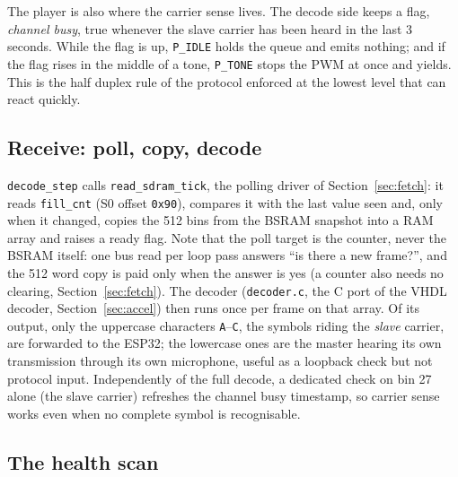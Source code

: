 \documentclass[a4paper,11pt]{article}
\begin{document}
The player is also where the carrier sense lives. The decode side keeps a flag,
\emph{channel busy}, true whenever the slave carrier has been heard in the last 3
seconds. While the flag is up, \texttt{P\_IDLE} holds the queue and emits nothing;
and if the flag rises in the middle of a tone, \texttt{P\_TONE} stops the PWM at
once and yields. This is the half duplex rule of the protocol enforced at the
lowest level that can react quickly.

\subsection{Receive: poll, copy, decode}

\texttt{decode\_step} calls \texttt{read\_sdram\_tick}, the polling driver of
Section~\ref{sec:fetch}: it reads \texttt{fill\_cnt} (S0 offset \texttt{0x90}),
compares it with the last value seen and, only when it changed, copies the 512
bins from the BSRAM snapshot into a RAM array and raises a ready flag. Note that
the poll target is the counter, never the BSRAM itself: one bus read per loop
pass answers ``is there a new frame?'', and the 512 word copy is paid only when
the answer is yes (a counter also needs no clearing, Section~\ref{sec:fetch}). The decoder (\texttt{decoder.c}, the C port of
the VHDL decoder, Section~\ref{sec:accel}) then runs once per frame on that
array. Of its output, only the uppercase characters \texttt{A}--\texttt{C}, the
symbols riding the \emph{slave} carrier, are forwarded to the ESP32; the
lowercase ones are the master hearing its own transmission through its own
microphone, useful as a loopback check but not protocol input. Independently of
the full decode, a dedicated check on bin 27 alone (the slave carrier) refreshes
the channel busy timestamp, so carrier sense works even when no complete symbol
is recognisable.

\subsection{The health scan}
\end{document}
